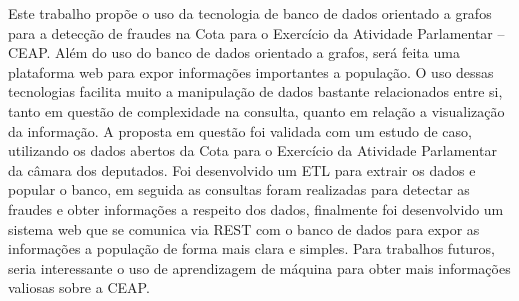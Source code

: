 	Este trabalho propõe o uso da tecnologia de banco de dados orientado a grafos para a detecção de fraudes na Cota para o Exercício da Atividade Parlamentar – CEAP. Além do uso do banco de dados orientado a grafos, será feita uma plataforma web para expor informações importantes a população. O uso dessas tecnologias facilita muito a manipulação de dados bastante relacionados entre si, tanto em questão de complexidade na consulta, quanto em relação a visualização da informação. A proposta em questão foi validada com um estudo de caso, utilizando os dados abertos da Cota para o Exercício da Atividade Parlamentar da câmara dos deputados. Foi desenvolvido um ETL para extrair os dados e popular o banco, em seguida as consultas foram realizadas para detectar as fraudes e obter informações a respeito dos dados, finalmente foi desenvolvido um sistema web que se comunica via REST com o banco de dados para expor as informações a população de forma mais clara e simples. Para trabalhos futuros, seria interessante o uso de aprendizagem de máquina para obter mais informações valiosas sobre a CEAP.